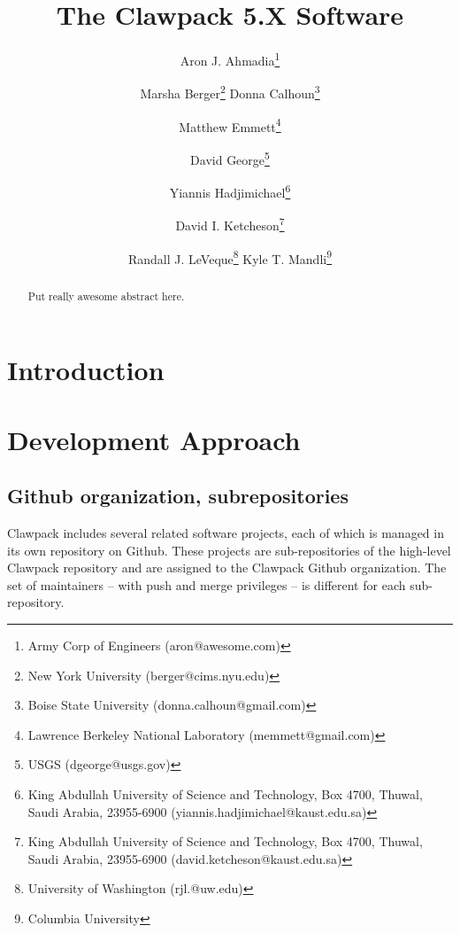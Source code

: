 \documentclass[]{siamltex}
\begin{document}
\ifpdf
{}
\else
{}
\fi

\title{The Clawpack 5.X Software}


\author{
        Aron J. Ahmadia\thanks{
            Army Corp of Engineers (\mbox{aron@awesome.com})} \and
        Marsha Berger\thanks{
            New York University (\mbox{berger@cims.nyu.edu})}
        Donna Calhoun\thanks{
            Boise State University (\mbox{donna.calhoun@gmail.com})} \and
        Matthew Emmett\thanks{
            Lawrence Berkeley National Laboratory (\mbox{memmett@gmail.com})} \and
        David George\thanks{
            USGS (\mbox{dgeorge@usgs.gov})} \and
        Yiannis Hadjimichael\thanks{
            King Abdullah University of Science and Technology, Box 4700, Thuwal, Saudi Arabia, 23955-6900 (\mbox{yiannis.hadjimichael@kaust.edu.sa})} \and
        David I. Ketcheson\thanks{
            King Abdullah University of Science and Technology, Box 4700, Thuwal, Saudi Arabia, 23955-6900 (\mbox{david.ketcheson@kaust.edu.sa})} \and
        Randall J. LeVeque\thanks{
            University of Washington (\mbox{rjl.@uw.edu})}
        Kyle T. Mandli\thanks{
            Columbia University} \and
        }

\maketitle

\begin{abstract}
    Put really awesome abstract here.
\end{abstract}

\section{Introduction}

\section{Development Approach}

\subsection{Github organization, subrepositories}
Clawpack includes several related software projects, each of which is managed in its own repository on Github.  These projects are sub-repositories of the high-level Clawpack repository and are assigned to the Clawpack Github organization.  The set of maintainers -- with push and merge privileges -- is different for each sub-repository.  
\end{document}
